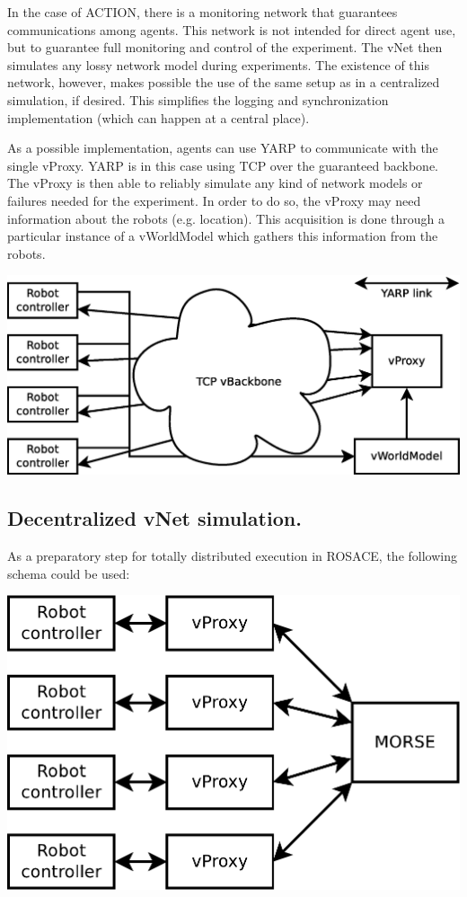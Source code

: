 \documentclass[a4paper,11pt]{article}
\begin{document}
In the case of ACTION, there is a monitoring network that guarantees communications among agents. This network is not intended for direct agent use, but to guarantee full monitoring and control of the experiment. The vNet then simulates any lossy network model during experiments. The existence of this network, however, makes possible the use of the same setup as in a centralized simulation, if desired. This simplifies the logging and synchronization implementation (which can happen at a central place).

As a possible implementation, agents can use YARP to communicate with the single vProxy. YARP is in this case using TCP over the guaranteed backbone. The vProxy is then able to reliably simulate any kind of network models or failures needed for the experiment. In order to do so, the vProxy may need information about the robots (e.g. location). This acquisition is done through a particular instance of a vWorldModel which gathers this information from the robots.

\begin{center}
\includegraphics[width=0.666\columnwidth]{figures/central+exp}
\end{center}

\subsection{Decentralized vNet simulation.}

As a preparatory step for totally distributed execution in ROSACE, the following schema could be used:

\begin{center}
\includegraphics[width=0.666\columnwidth]{figures/distrib+morse}
\end{center}
\end{document}
